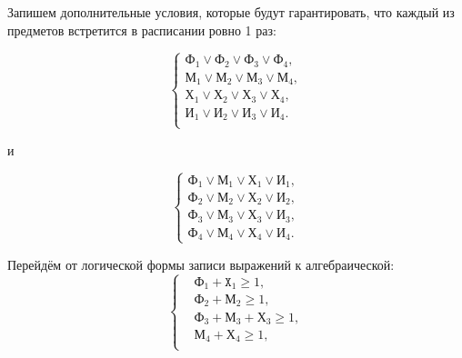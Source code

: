 Запишем дополнительные условия, которые будут гарантировать, что каждый
из предметов встретится в расписании ровно 1 раз:
\begin{minipage}[h!]{0.48\linewidth}
  \begin{equation*}
    \left\{
      \begin{aligned}
        \texttt{Ф}_1 \lor \texttt{Ф}_2 \lor \texttt{Ф}_3 \lor \texttt{Ф}_4, \\
        \texttt{М}_1 \lor \texttt{М}_2 \lor \texttt{М}_3 \lor \texttt{М}_4, \\
        \texttt{Х}_1 \lor \texttt{Х}_2 \lor \texttt{Х}_3 \lor \texttt{Х}_4, \\
        \texttt{И}_1 \lor \texttt{И}_2 \lor \texttt{И}_3 \lor \texttt{И}_4. \\
      \end{aligned}
    \right.
  \end{equation*}
\end{minipage}
\hfill
и
\hfill
\begin{minipage}[h!]{0.48\linewidth}
  \begin{equation*}
    \left\{
      \begin{aligned}
        \texttt{Ф}_1 \lor \texttt{М}_1 \lor \texttt{Х}_1 \lor \texttt{И}_1, \\
        \texttt{Ф}_2 \lor \texttt{М}_2 \lor \texttt{Х}_2 \lor \texttt{И}_2, \\
        \texttt{Ф}_3 \lor \texttt{М}_3 \lor \texttt{Х}_3 \lor \texttt{И}_3, \\
        \texttt{Ф}_4 \lor \texttt{М}_4 \lor \texttt{Х}_4 \lor \texttt{И}_4.
      \end{aligned}
    \right.
  \end{equation*}
\end{minipage}

\vspace{7mm}

\setlength{\belowdisplayskip}{0pt} \setlength{\belowdisplayshortskip}{0pt}

Перейдём от логической формы записи выражений к алгебраической:
\begin{equation*}
  \left\{
    \begin{aligned}
      &\texttt{Ф}_1 + \texttt{X}_1 \ge 1, \\
      &\texttt{Ф}_2 + \texttt{М}_2 \ge 1, \\
      &\texttt{Ф}_3 + \texttt{М}_3 + \texttt{Х}_3 \ge 1, \\
      &\texttt{М}_4 + \texttt{Х}_4 \ge 1, \\
    \end{aligned}
  \right.
\end{equation*}

